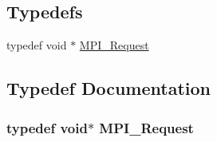 \subsection*{Typedefs}
\begin{DoxyCompactItemize}
\item 
typedef void $\ast$ \hyperlink{null-message-mpi-interface_8h_a31b372fd1cca939295900acb2a4961dd}{M\+P\+I\+\_\+\+Request}
\end{DoxyCompactItemize}


\subsection{Typedef Documentation}
\subsubsection[{\texorpdfstring{M\+P\+I\+\_\+\+Request}{MPI_Request}}]{\setlength{\rightskip}{0pt plus 5cm}typedef void$\ast$ {\bf M\+P\+I\+\_\+\+Request}}\hypertarget{null-message-mpi-interface_8h_a31b372fd1cca939295900acb2a4961dd}{}\label{null-message-mpi-interface_8h_a31b372fd1cca939295900acb2a4961dd}
